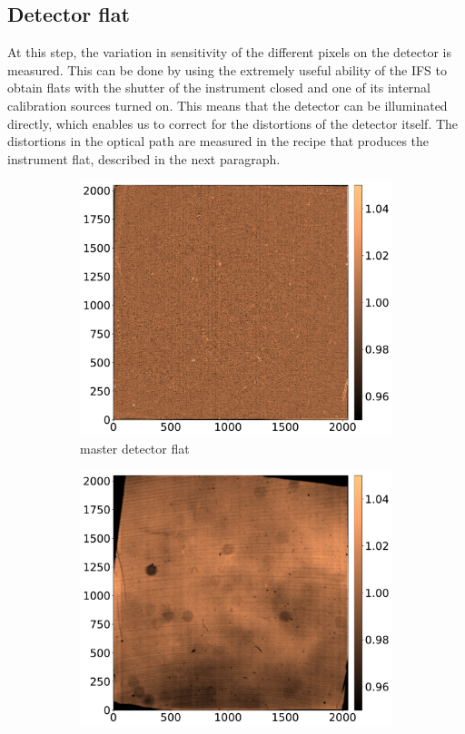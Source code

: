 \documentclass[twoside,single,12pt]{lion-msc}
\begin{document}
\subsection{Detector flat}
At this step, the variation in sensitivity of the different pixels on the detector is measured. This can be done by using the extremely useful ability of the IFS to obtain flats with the shutter of the instrument closed and one of its internal calibration sources turned on. This means that the detector can be illuminated directly, which enables us to correct for the distortions of the detector itself. The distortions in the optical path are measured in the recipe that produces the instrument flat, described in the next paragraph. 
\bigskip

\begin{figure}[!b]
\centering
\begin{subfigure}{.48\textwidth}
  \centering
  \includegraphics[width=1\linewidth]{masterdetectorflat}
  \caption{master detector flat}
  \label{fig:masterdetectorflat}
\end{subfigure}\hfill
\begin{subfigure}{.48\textwidth}
  \centering
  \includegraphics[width=1\linewidth]{largescaleflat}

\end{subfigure}
\end{figure}
\end{document}
